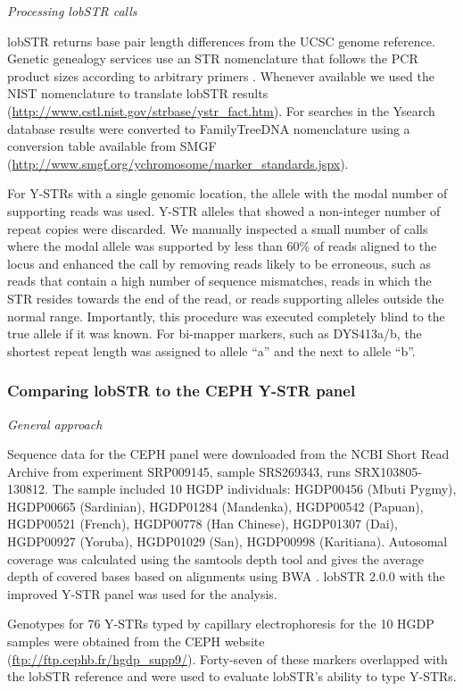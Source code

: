 \emph{Processing lobSTR calls}

lobSTR returns base pair length differences from the UCSC genome reference. Genetic genealogy services use an STR nomenclature that follows the PCR product sizes according to arbitrary primers \cite{GusmaoButlerCarracedoEtAl2006}. Whenever available we used the NIST nomenclature to translate lobSTR results (\url{http://www.cstl.nist.gov/strbase/ystr_fact.htm}). For searches in the Ysearch database results were converted to FamilyTreeDNA nomenclature using a conversion table available from SMGF (\url{http://www.smgf.org/ychromosome/marker_standards.jspx}). 

For Y-STRs with a single genomic location, the allele with the modal number of supporting reads was used. Y-STR alleles that showed a non-integer number of repeat copies were discarded. We manually inspected a small number of calls where the modal allele was supported by less than 60\% of reads aligned to the locus and enhanced the call by removing reads likely to be erroneous, such as reads that contain a high number of sequence mismatches, reads in which the STR resides towards the end of the read, or reads supporting alleles outside the normal range. Importantly, this procedure was executed completely blind to the true allele if it was known. For bi-mapper markers, such as DYS413a/b, the shortest repeat length was assigned to allele ``a'' and the next to allele ``b''. 

\subsubsection{Comparing lobSTR to the CEPH Y-STR panel}

\emph{General approach}

Sequence data for the CEPH panel were downloaded from the NCBI Short Read Archive from experiment SRP009145, sample SRS269343, runs SRX103805-130812. The sample included 10 HGDP individuals: HGDP00456 (Mbuti Pygmy), HGDP00665 (Sardinian), HGDP01284 (Mandenka), HGDP00542 (Papuan), HGDP00521 (French), HGDP00778 (Han Chinese), HGDP01307 (Dai), HGDP00927 (Yoruba), HGDP01029 (San), HGDP00998 (Karitiana). Autosomal coverage was calculated using the samtools \cite{LiHandsakerWysokerEtAl2009} depth tool and gives the average depth of covered bases based on alignments using BWA \cite{LiDurbin2009a}. lobSTR 2.0.0 with the improved Y-STR panel was used for the analysis.

Genotypes for 76 Y-STRs typed by capillary electrophoresis for the 10 HGDP samples were obtained from the CEPH website (\url{ftp://ftp.cephb.fr/hgdp_supp9/}). Forty-seven of these markers overlapped with the lobSTR reference and were used to evaluate lobSTR's ability to type Y-STRs.

